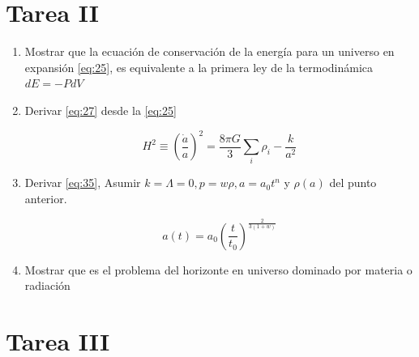\documentclass[a4paper]{article}
\begin{document}
\section{Tarea II}

\begin{enumerate}
	\item Mostrar que la ecuación de conservación de la energía para un universo en expansión \eqref{eq:25}, es equivalente a la primera ley de la termodinámica $dE=-PdV$
	\item Derivar \eqref{eq:27} desde la \eqref{eq:25}
	
\begin{equation}
H^2 \equiv \left( \frac{\dot{a}}{a} \right)^2 = \frac{8\pi G}{3} \sum_i \rho_i - \frac{k}{a^2} 
\tag{27}
\label{eq:27}
\end{equation}

	
	\item Derivar \eqref{eq:35}, Asumir $k=\Lambda=0, p=w\rho,a=a_0t^n$ y $\rho(a)$ del punto anterior.

\begin{equation}
a(t) = a_0 \left( \frac{t}{t_0} \right)^{\frac{2}{3(1+w)}}
\tag{35}
\label{eq:35}
\end{equation}


	\item Mostrar que es el problema del horizonte en universo dominado por materia o radiación
\end{enumerate}



\section{Tarea III}
\end{document}
